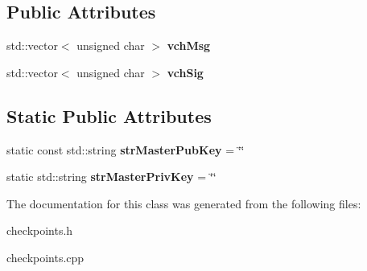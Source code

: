 \subsection*{Public Attributes}
\begin{DoxyCompactItemize}
\item 
\mbox{\label{class_c_sync_checkpoint_a8974d80564b97266199d23cc4b35ed66}} 
std\+::vector$<$ unsigned char $>$ {\bfseries vch\+Msg}
\item 
\mbox{\label{class_c_sync_checkpoint_ab63efcc435ebd5fc5ae49fa1d6381b1f}} 
std\+::vector$<$ unsigned char $>$ {\bfseries vch\+Sig}
\end{DoxyCompactItemize}
\subsection*{Static Public Attributes}
\begin{DoxyCompactItemize}
\item 
\mbox{\label{class_c_sync_checkpoint_afb7a4b2294aecf9b422cc6a67a64207a}} 
static const std\+::string {\bfseries str\+Master\+Pub\+Key} = \char`\"{}\char`\"{}
\item 
\mbox{\label{class_c_sync_checkpoint_ab767dc28cb057a4e1e15d847ae1b699d}} 
static std\+::string {\bfseries str\+Master\+Priv\+Key} = \char`\"{}\char`\"{}
\end{DoxyCompactItemize}


The documentation for this class was generated from the following files\+:\begin{DoxyCompactItemize}
\item 
checkpoints.\+h\item 
checkpoints.\+cpp\end{DoxyCompactItemize}
